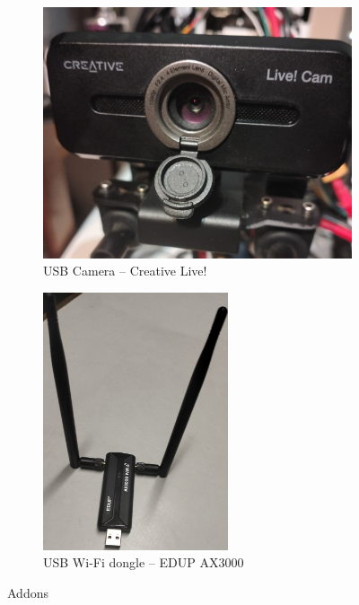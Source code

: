 \begin{figure}[!hbt]
  \centering
  \begin{subfigure}[t]{0.49\textwidth}
    \centering
    \includegraphics[width=1.0\textwidth]{./img/jpg/creative-cam} 
    \caption{USB Camera -- Creative Live!}%
    \label{fig:addons-cam}
  \end{subfigure}
  \begin{subfigure}[t]{0.49\textwidth}
    \centering
  \includegraphics[width=0.6\textwidth]{./img/jpg/ax3000} 
    \caption{USB Wi-Fi dongle -- EDUP AX3000}%
    \label{fig:addons-wifi}
  \end{subfigure}
  \caption{Addons}
  \label{fig:addons}
\end{figure}

